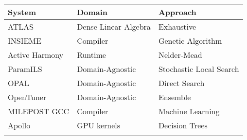 \begin{table}
    \centering
    \scriptsize
    \begin{tabular}{@{}lll@{}}
        \toprule
        System & Domain & Approach \\ \midrule
        \rowcolor{red!25} ATLAS & Dense Linear Algebra & Exhaustive\\ \addlinespace
        \rowcolor{green!25} INSIEME & Compiler & Genetic Algorithm \\
        \rowcolor{green!25} Active Harmony & Runtime & Nelder-Mead \\
        \rowcolor{green!25} ParamILS & Domain-Agnostic & Stochastic Local Search \\
        \rowcolor{green!25} OPAL & Domain-Agnostic & Direct Search \\
        \rowcolor{green!25} OpenTuner & Domain-Agnostic & Ensemble \\ \addlinespace
        \rowcolor{cyan!25} MILEPOST GCC & Compiler & Machine Learning \\
        \rowcolor{cyan!25} Apollo & GPU kernels & Decision Trees \\ \addlinespace
        \bottomrule
    \end{tabular}
\end{table}

